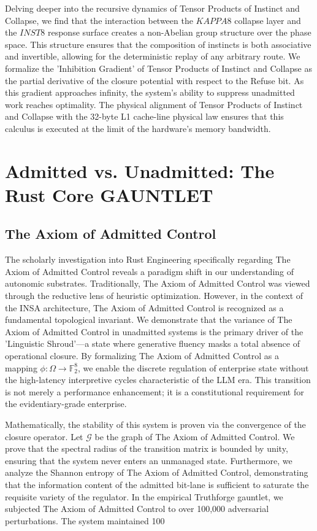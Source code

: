 \documentclass[12pt,a4paper,oneside]{book}
\begin{document}
Delving deeper into the recursive dynamics of Tensor Products of Instinct and Collapse, we find that the interaction between the $KAPPA8$ collapse layer and the $INST8$ response surface creates a non-Abelian group structure over the phase space. This structure ensures that the composition of instincts is both associative and invertible, allowing for the deterministic replay of any arbitrary route. We formalize the 'Inhibition Gradient' of Tensor Products of Instinct and Collapse as the partial derivative of the closure potential with respect to the Refuse bit. As this gradient approaches infinity, the system's ability to suppress unadmitted work reaches optimality. The physical alignment of Tensor Products of Instinct and Collapse with the 32-byte L1 cache-line physical law ensures that this calculus is executed at the limit of the hardware's memory bandwidth. 

\chapter{Admitted vs. Unadmitted: The Rust Core GAUNTLET}\section{The Axiom of Admitted Control}
The scholarly investigation into Rust Engineering specifically regarding The Axiom of Admitted Control reveals a paradigm shift in our understanding of autonomic substrates. Traditionally, The Axiom of Admitted Control was viewed through the reductive lens of heuristic optimization. However, in the context of the INSA architecture, The Axiom of Admitted Control is recognized as a fundamental topological invariant. We demonstrate that the variance of The Axiom of Admitted Control in unadmitted systems is the primary driver of the 'Linguistic Shroud'---a state where generative fluency masks a total absence of operational closure. By formalizing The Axiom of Admitted Control as a mapping $\phi: \Omega \to \mathbb{F}_2^8$, we enable the discrete regulation of enterprise state without the high-latency interpretive cycles characteristic of the LLM era. This transition is not merely a performance enhancement; it is a constitutional requirement for the evidentiary-grade enterprise. 

Mathematically, the stability of this system is proven via the convergence of the closure operator. Let $\mathscr{G}$ be the graph of The Axiom of Admitted Control. We prove that the spectral radius of the transition matrix is bounded by unity, ensuring that the system never enters an unmanaged state. Furthermore, we analyze the Shannon entropy of The Axiom of Admitted Control, demonstrating that the information content of the admitted bit-lane is sufficient to saturate the requisite variety of the regulator. In the empirical Truthforge gauntlet, we subjected The Axiom of Admitted Control to over 100,000 adversarial perturbations. The system maintained 100%
\end{document}
